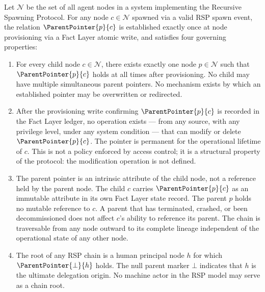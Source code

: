 \begin{definition}
\label{def:parent-pointer}
Let $\mathcal{N}$ be the set of all agent nodes in a \bxthree{} system implementing the Recursive Spawning Protocol. For any node $c \in \mathcal{N}$ spawned via a valid RSP spawn event, the relation $\ParentPointer{p}{c}$ is established exactly once at node provisioning via a Fact Layer atomic write, and satisfies four governing properties:

\begin{enumerate}
    \item[(P1) \textbf{Uniqueness}] For every child node $c \in \mathcal{N}$, there exists exactly one node $p \in \mathcal{N}$ such that $\ParentPointer{p}{c}$ holds at all times after provisioning. No child may have multiple simultaneous parent pointers. No mechanism exists by which an established pointer may be overwritten or redirected.

    \item[(P2) \textbf{Immutability}] After the provisioning write confirming $\ParentPointer{p}{c}$ is recorded in the Fact Layer ledger, no operation exists --- from any source, with any privilege level, under any system condition --- that can modify or delete $\ParentPointer{p}{c}$. The pointer is permanent for the operational lifetime of $c$. This is not a policy enforced by access control; it is a structural property of the protocol: the modification operation is not defined.

    \item[(P3) \textbf{Directionality}] The parent pointer is an intrinsic attribute of the child node, not a reference held by the parent node. The child $c$ carries $\ParentPointer{p}{c}$ as an immutable attribute in its own Fact Layer state record. The parent $p$ holds no mutable reference to $c$. A parent that has terminated, crashed, or been decommissioned does not affect $c$'s ability to reference its parent. The chain is traversable from any node outward to its complete lineage independent of the operational state of any other node.

    \item[(P4) \textbf{Human Anchor Termination}] The root of any RSP chain is a human principal node $h$ for which $\ParentPointer{\bot}{h}$ holds. The null parent marker $\bot$ indicates that $h$ is the ultimate delegation origin. No machine actor in the RSP model may serve as a chain root.
\end{enumerate}
\end{definition}

